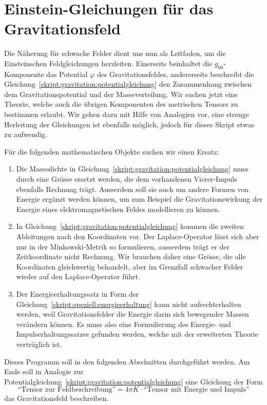 \section{Einstein-Gleichungen für das Gravitationsfeld}
Die Näherung für schwache Felder dient uns nun als Leitfaden, um die
Einsteinschen Feldgleichungen herzleiten.
Einerseits beinhaltet die $g_{00}$-Komponente das Potential $\varphi$ des
Gravitationsfeldes, andererseits beschreibt die
Gleichung~\eqref{skript:gravitation:potentialgleichung}
den Zusammenhang zwischen dem Gravitationspotential und der
Masseverteilung.
Wir suchen jetzt eine Theorie, welche auch die übrigen Komponenten
des metrischen Tensors zu bestimmen erlaubt.
Wir gehen dazu mit Hilfe von Analogien vor, eine strenge Herleitung
der Gleichungen ist ebenfalls möglich, jedoch für dieses Skript etwas
zu aufwendig.

Für die folgenden mathematischen Objekte suchen wir einen Ersatz:
\begin{enumerate}
\item
Die Massedichte in 
Gleichung~\eqref{skript:gravitation:potentialgleichung}
muss durch eine Grösse ersetzt werden, die dem vorhandenen Vierer-Impuls
ebenfalls Rechnung trägt.
Ausserdem soll sie auch um andere Formen von Energie ergänzt werden 
können, um zum Beispiel die Gravitationswirkung der Energie eines
elektromagnetischen Feldes modellieren zu können.
\item
In Gleichung~\eqref{skript:gravitation:potentialgleichung}
kommen die zweiten Ableitungen nach den Koordinaten vor. 
Der Laplace-Operator lässt sich aber nur in der Minkowski-Metrik so 
formulieren, ausserdem trägt er der Zeitkoordinate nicht Rechnung.
Wir brauchen daher eine Grösse, die alle Koordinaten gleichwertig
behandelt, aber im Grenzfall schwacher Felder wieder auf den 
Laplace-Operator führt.
\item
Der Energieerhaltungssatz in Form der
Gleichung~\eqref{skript:speziell:energieerhaltung}
kann nicht aufrechterhalten werden, weil
Gravitationsfelder die Energie darin sich bewegender Massen verändern
können.
Es muss also eine Formulierung des Energie- und Impulserhaltungssatzes
gefunden werden, welche mit der erweiterten Theorie verträglich ist.
\end{enumerate}
Dieses Programm soll in den folgenden Abschnitten durchgeführt werden.
Am Ende soll in Analogie zur 
Potentialgleichung~\eqref{skript:gravitation:potentialgleichung}
eine Gleichung der Form
\[
\text{``Tensor zur Feldbeschreibung''}
=
4\pi K\cdot \text{``Tensor mit Energie und Impuls''}
\]
das Gravitationsfeld beschreiben.

